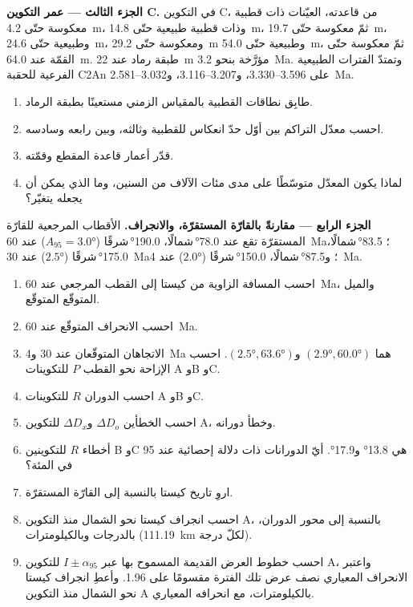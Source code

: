 \begin{problem}
\medskip\noindent\textbf{الجزء الثالث --- عمر التكوين C.} في التكوين C،
من قاعدته، العيّنات ذات قطبية معكوسة حتّى \qty{4.2}{m}، وذات قطبية طبيعية حتّى
\qty{14.8}{m}، ثمّ معكوسة حتّى \qty{19.7}{m}، وطبيعية حتّى \qty{24.6}{m}، ومعكوسة حتّى
\qty{29.2}{m} وطبيعية حتّى \qty{54.0}{m}، ثمّ معكوسة حتّى القمّة عند
\qty{64.0}{m}. طبقة رماد عند \qty{22}{m} مؤرَّخة بنحو \qty{3.2}{Ma}. وتمتدّ الفترات
الطبيعية الفرعية للحقبة C2An على 3.596--3.330، و3.207--3.116،
و3.032--\qty{2.581}{Ma}.
\begin{enumerate}[resume]
  \item طابِق نطاقات القطبية بالمقياس الزمني مستعينًا بطبقة الرماد.
  \item احسب معدّل التراكم بين أوّل حدّ انعكاس للقطبية وثالثه،
        وبين رابعه وسادسه.
  \item قدّر أعمار قاعدة المقطع وقمّته.
  \item لماذا يكون المعدّل متوسّطًا على مدى مئات الآلاف من السنين، وما الذي
        يمكن أن يجعله يتغيّر؟
\end{enumerate}

\medskip\noindent\textbf{الجزء الرابع --- مقارنةً بالقارّة المستقرّة، والانجراف.} الأقطاب المرجعية
للقارّة المستقرّة تقع عند \ang{78.0}\,شمالًا، \ang{190.0}\,شرقًا
($A_{95} = \ang{3.0}$) عند \qty{60}{Ma}؛ \ang{83.5}\,شمالًا، \ang{175.0}\,شرقًا
($\ang{2.5}$) عند \qty{30}{Ma}؛ و\ang{87.5}\,شمالًا، \ang{150.0}\,شرقًا ($\ang{2.0}$)
عند \qty{4}{Ma}.
\begin{enumerate}[resume]
  \item احسب المسافة الزاوية من كيستا إلى القطب المرجعي عند \qty{60}{Ma}،
        والميل المتوقّع  المتوقّع.
  \item احسب الانحراف المتوقّع عند \qty{60}{Ma}.
  \item الاتجاهان المتوقّعان عند 30 و\qty{4}{Ma} هما $(\ang{2.9},
        \ang{60.0})$ و$(\ang{2.5}, \ang{63.6})$. احسب الإزاحة نحو القطب
        $P$ للتكوينات A وB وC.
  \item احسب الدوران $R$ للتكوينات A وB وC.
  \item احسب الخطأين $\Delta D_o$ و$\Delta D_x$ للتكوين A، وخطأ
        دورانه.
  \item أخطاء $R$ للتكوينين B وC هي \ang{13.8} و\ang{17.9}. أيّ الدورانات
        ذات دلالة إحصائية عند 95 في المئة؟
  \item اروِ تاريخ كيستا بالنسبة إلى القارّة المستقرّة.
  \item احسب انجراف كيستا نحو الشمال منذ التكوين A، بالنسبة إلى محور الدوران،
        بالدرجات وبالكيلومترات
        (\qty{111.19}{km} لكلّ درجة).
  \item احسب خطوط العرض القديمة المسموح بها عبر $I \pm \alpha_{95}$ للتكوين
        A، واعتبر الانحراف المعياري نصف عرض تلك
        الفترة مقسومًا على 1.96. وأعطِ انجراف كيستا نحو الشمال منذ التكوين
        A بالكيلومترات، مع انحرافه المعياري.
\end{enumerate}
\end{problem}
